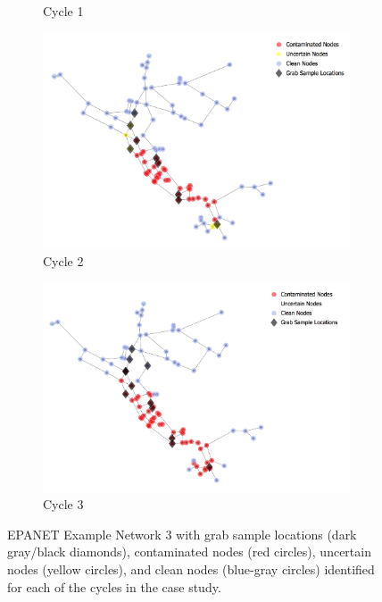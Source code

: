 \begin{figure}[!h]
\begin{subfigure}{0.49\textwidth}
\caption{Cycle 1}
\label{fig:case_study_cycle2}
\end{subfigure}
\centering
\begin{subfigure}{0.49\textwidth}
\centering
\includegraphics[width = \textwidth]{graphics/sampling_cs_cycle3.png}
\caption{Cycle 2}
\label{fig:case_study_cycle3}
\end{subfigure}
\begin{subfigure}{0.49\textwidth}
\centering
\includegraphics[width = \textwidth]{graphics/sampling_cs_cycle4.png}
\caption{Cycle 3}
\label{fig:case_study_cycle4}
\end{subfigure}
\caption{EPANET Example Network 3 with grab sample locations (dark gray/black diamonds), contaminated nodes (red circles), uncertain nodes (yellow circles), and clean nodes (blue-gray circles) identified for each of the cycles in the case study.}
\label{fig:gs_uq_case_study}
\end{figure}

